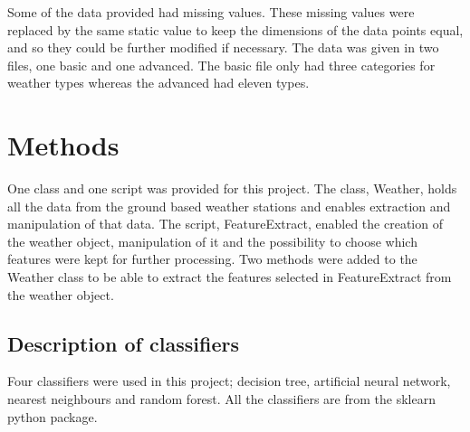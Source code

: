 \documentclass[12pt]{article}
\begin{document}
\newpage

Some of the data provided had missing values. These missing values were replaced by the same static value to keep the dimensions of the data points equal, and so they could be further modified if necessary.
\newline
The data was given in two files, one basic and one advanced. The basic file only had three categories for weather types whereas the advanced had eleven types.

\section{Methods}
One class and one script was provided for this project. The class, Weather, holds all the data from the ground based weather stations and enables \newline extraction and manipulation of that data. The script, FeatureExtract, \newline enabled the creation of the weather object, manipulation of it and the \newline possibility to choose which features were kept for further processing. Two methods were added to the Weather class to be able to extract the features selected in FeatureExtract from the weather object.
\subsection{Description of classifiers}
Four classifiers were used in this project; decision tree, artificial neural \newline network, nearest neighbours and random forest. All the classifiers are from the sklearn python package.
\end{document}
